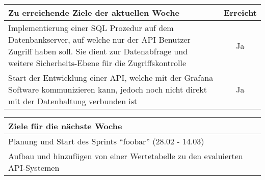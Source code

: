 \begin{tabularx}{\textwidth}{Xc}
    \arrayrulecolor{OliveGreen}
    \toprule
    {\bfseries Zu erreichende Ziele der aktuellen Woche} & {\bfseries Erreicht} \\
    \midrule[2pt]
    Implementierung einer SQL Prozedur auf dem Datenbankserver, auf welche nur
    der API Benutzer Zugriff haben soll. Sie dient zur Datenabfrage und
    weitere Sicherheits-Ebene für die Zugriffskontrolle  &  Ja  \\
    \rowcolor{OliveGreen!15}
    Start der Entwicklung einer API, welche mit der Grafana Software
    kommunizieren kann, jedoch noch nicht direkt mit der Datenhaltung verbunden
    ist  &  Ja  \\
    \bottomrule[2pt]
\end{tabularx}
%
\vspace{1cm}
%
\begin{tabularx}{\textwidth}{Xc}
    \arrayrulecolor{OliveGreen}
    \toprule
    {\bfseries Ziele für die nächste Woche}              &                   \\
    \midrule[2pt]
    Planung und Start des Sprints ``foobar'' (28.02 - 14.03)  &  \\
    \rowcolor{OliveGreen!15}
    Aufbau und hinzufügen von einer Wertetabelle zu den evaluierten
    API-Systemen  &  \\
\end{tabularx}
